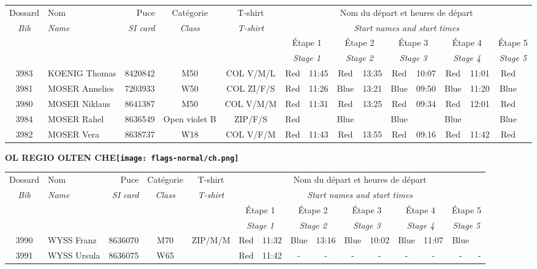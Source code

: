 \documentclass{report}
\begin{document}
  \begin{longtable}{|c|l|r|c|c|*{5}{cc|}}
    Dossard & Nom  & Puce    & Catégorie & T-shirt & \multicolumn{10}{c|}{Nom du départ et heures de départ} \\
    \itshape Bib     & \itshape Name & \itshape SI card & \itshape Class  & \itshape  T-shirt  & \multicolumn{10}{c|}{\itshape Start names and start times} \\
    \hline
    & & & & & \multicolumn{2}{c|}{Étape 1} & \multicolumn{2}{c|}{Étape 2} & \multicolumn{2}{c|}{Étape 3} & \multicolumn{2}{c|}{Étape 4} & \multicolumn{2}{c|}{Étape 5} \\
    & & & & & \multicolumn{2}{c|}{\itshape Stage 1} & \multicolumn{2}{c|}{\itshape Stage 2} & \multicolumn{2}{c|}{\itshape Stage 3} & \multicolumn{2}{c|}{\itshape Stage 4} & \multicolumn{2}{c|}{\itshape Stage 5} \\
    \hline
    3983 & KOENIG Thomas & 8420842 & M50 & COL V/M/L & Red & 11:45 & Red & 13:35 & Red & 10:07 & Red & 11:01 & Red &  \\
    3981 & MOSER Annelies & 7203933 & W50 & COL ZI/F/S & Red & 11:26 & Blue & 13:21 & Blue & 09:50 & Blue & 11:20 & Blue &  \\
    3980 & MOSER Niklaus & 8641387 & M50 & COL V/M/M & Red & 11:31 & Red & 13:25 & Red & 09:34 & Red & 12:01 & Red &  \\
    3984 & MOSER Rahel & 8636549 & Open violet B & ZIP/F/S & Red &   & Blue &   & Blue &   & Blue &   & Blue &  \\
    3982 & MOSER Vera & 8638737 & W18 & COL V/F/M & Red & 11:43 & Red & 13:55 & Red & 09:16 & Red & 11:42 & Red &  \\
  \end{longtable}
\newpage
  \Huge \centering \bfseries OL REGIO OLTEN  CHE\normalfont \footnotesize \sffamily \hfill \texttt{[image: flags-normal/ch.png]} \newline 
  \begin{longtable}{|c|l|r|c|c|*{5}{cc|}}
    Dossard & Nom  & Puce    & Catégorie & T-shirt & \multicolumn{10}{c|}{Nom du départ et heures de départ} \\
    \itshape Bib     & \itshape Name & \itshape SI card & \itshape Class  & \itshape  T-shirt  & \multicolumn{10}{c|}{\itshape Start names and start times} \\
    \hline
    & & & & & \multicolumn{2}{c|}{Étape 1} & \multicolumn{2}{c|}{Étape 2} & \multicolumn{2}{c|}{Étape 3} & \multicolumn{2}{c|}{Étape 4} & \multicolumn{2}{c|}{Étape 5} \\
    & & & & & \multicolumn{2}{c|}{\itshape Stage 1} & \multicolumn{2}{c|}{\itshape Stage 2} & \multicolumn{2}{c|}{\itshape Stage 3} & \multicolumn{2}{c|}{\itshape Stage 4} & \multicolumn{2}{c|}{\itshape Stage 5} \\
    \hline
    3990 & WYSS Franz & 8636070 & M70 & ZIP/M/M & Red & 11:32 & Blue & 13:16 & Blue & 10:02 & Blue & 11:07 & Blue &  \\
    3991 & WYSS Ursula & 8636075 & W65 &   & Red & 11:42 & - &  - & - &  - & - &  - & - &  -\\
  \end{longtable}
\end{document}
